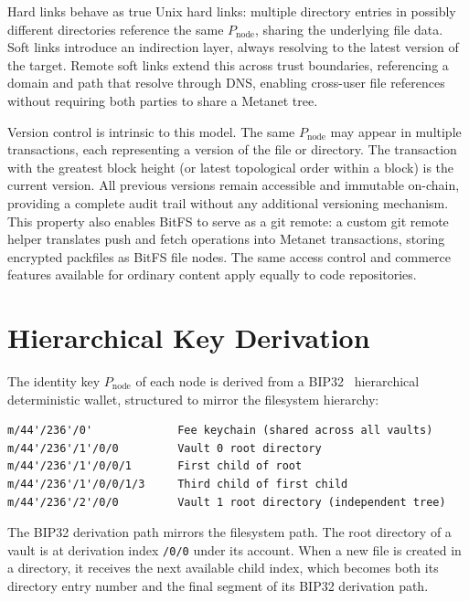 \documentclass[11pt,a4paper]{article}
\begin{document}
Hard links behave as true Unix hard links: multiple directory entries in possibly different directories reference the same $P_{\text{node}}$, sharing the underlying file data. Soft links introduce an indirection layer, always resolving to the latest version of the target. Remote soft links extend this across trust boundaries, referencing a domain and path that resolve through DNS, enabling cross-user file references without requiring both parties to share a Metanet tree.

Version control is intrinsic to this model. The same $P_{\text{node}}$ may appear in multiple transactions, each representing a version of the file or directory. The transaction with the greatest block height (or latest topological order within a block) is the current version. All previous versions remain accessible and immutable on-chain, providing a complete audit trail without any additional versioning mechanism. This property also enables BitFS to serve as a git remote: a custom git remote helper translates push and fetch operations into Metanet transactions, storing encrypted packfiles as BitFS file nodes. The same access control and commerce features available for ordinary content apply equally to code repositories.

\section{Hierarchical Key Derivation}

The identity key $P_{\text{node}}$ of each node is derived from a BIP32~\cite{bip32} hierarchical deterministic wallet, structured to mirror the filesystem hierarchy:

\begin{lstlisting}
m/44'/236'/0'             Fee keychain (shared across all vaults)
m/44'/236'/1'/0/0         Vault 0 root directory
m/44'/236'/1'/0/0/1       First child of root
m/44'/236'/1'/0/0/1/3     Third child of first child
m/44'/236'/2'/0/0         Vault 1 root directory (independent tree)
\end{lstlisting}

The BIP32 derivation path mirrors the filesystem path. The root directory of a vault is at derivation index \texttt{/0/0} under its account. When a new file is created in a directory, it receives the next available child index, which becomes both its directory entry number and the final segment of its BIP32 derivation path.
\end{document}
